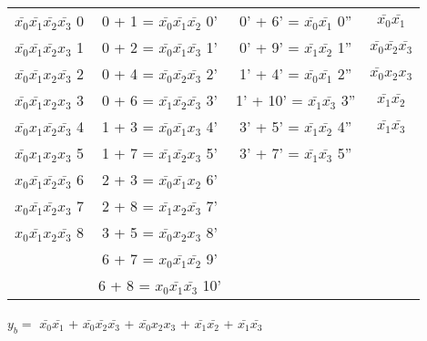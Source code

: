 \documentclass{bmstu}
\begin{document}
	\begin{center}
		\begin{tabular}{ |c|c|c|c| }         
			\hline
		$\bar{x_0} \bar{x_1} \bar{x_2} \bar{x_3} $  0&0 + 1 = $\bar{x_0} \bar{x_1} \bar{x_2} $  0' &0' + 6' = $\bar{x_0} \bar{x_1} $  0'' &$\bar{x_0} \bar{x_1} $\\
		$\bar{x_0} \bar{x_1} \bar{x_2} x_3 $  1&0 + 2 = $\bar{x_0} \bar{x_1} \bar{x_3} $  1' &0' + 9' = $\bar{x_1} \bar{x_2} $  1'' &$\bar{x_0} \bar{x_2} \bar{x_3} $\\
		$\bar{x_0} \bar{x_1} x_2 \bar{x_3} $  2&0 + 4 = $\bar{x_0} \bar{x_2} \bar{x_3} $  2' &1' + 4' = $\bar{x_0} \bar{x_1} $  2'' &$\bar{x_0} x_2 x_3 $\\
		$\bar{x_0} \bar{x_1} x_2 x_3 $  3&0 + 6 = $\bar{x_1} \bar{x_2} \bar{x_3} $  3' &1' + 10' = $\bar{x_1} \bar{x_3} $  3'' &$\bar{x_1} \bar{x_2} $\\
		$\bar{x_0} x_1 \bar{x_2} \bar{x_3} $  4&1 + 3 = $\bar{x_0} \bar{x_1} x_3 $  4' &3' + 5' = $\bar{x_1} \bar{x_2} $  4'' &$\bar{x_1} \bar{x_3} $\\
		$\bar{x_0} x_1 x_2 x_3 $  5&1 + 7 = $\bar{x_1} \bar{x_2} x_3 $  5' &3' + 7' = $\bar{x_1} \bar{x_3} $  5'' &   \\
		$x_0 \bar{x_1} \bar{x_2} \bar{x_3} $  6&2 + 3 = $\bar{x_0} \bar{x_1} x_2 $  6' & &   \\
		$x_0 \bar{x_1} \bar{x_2} x_3 $  7&2 + 8 = $\bar{x_1} x_2 \bar{x_3} $  7' & &   \\
		$x_0 \bar{x_1} x_2 \bar{x_3} $  8&3 + 5 = $\bar{x_0} x_2 x_3 $  8' & &   \\
		&6 + 7 = $x_0 \bar{x_1} \bar{x_2} $  9' & &   \\
		&6 + 8 = $x_0 \bar{x_1} \bar{x_3} $ 10' & &   \\
			\hline
		\end{tabular}
	\end{center}
	$y_b =$ $\bar{x_0} \bar{x_1} $ + $\bar{x_0} \bar{x_2} \bar{x_3} $ + $\bar{x_0} x_2 x_3 $ + $\bar{x_1} \bar{x_2} $ + $\bar{x_1} \bar{x_3} $
\end{document}
